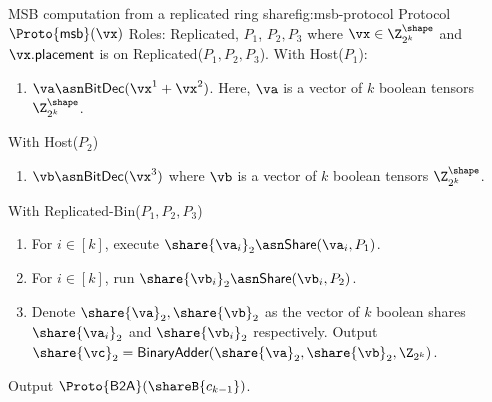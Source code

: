 \begin{Boxfig}{MSB computation from a replicated ring share}{fig:msb-protocol}
  {Protocol $\Proto{\mathsf{msb}}(\vx)$}
  Roles: Replicated, $P_1$, $P_2, P_3$ where $\vx \in \Z_{2^k}^\shape$ and
  $\vx.\mathsf{placement}$ is on Replicated($P_1, P_2, P_3$). \newline
  With Host($P_1$):
  \begin{enumerate}
    \item $\va \asn \textsf{BitDec}(\vx^1 + \vx^2)$. Here, $\va$ is a vector of $k$ boolean tensors $\Z_{2^k}^\shape$.
  \end{enumerate}
  With Host($P_2$)
  \begin{enumerate}
    \item $\vb \asn \textsf{BitDec}(\vx^3)$ where $\vb$ is a vector of $k$ boolean tensors $\Z_{2^k}^\shape$.
  \end{enumerate}
  With Replicated-Bin($P_1, P_2, P_3$)
  \begin{enumerate}
    \item For $i \in [k]$, execute $\share{\va_i}_2 \asn \mathsf{Share}(\va_i, P_1)$.
    \item For $i \in [k]$, run $\share{\vb_i}_2 \asn \mathsf{Share}(\vb_i, P_2)$.
    \item Denote $\share{\va}_2, \share{\vb}_2$ as the vector of $k$ boolean shares
    $\share{\va_i}_2$ and $\share{\vb_i}_2$ respectively. Output $\share{\vc}_2 = \textsf{BinaryAdder}(\share{\va}_2, \share{\vb}_2, \Z_{2^k})$.
  \end{enumerate}
  Output $\Proto{\textsf{B2A}}(\shareB{c_{k-1}})$.

\end{Boxfig}

